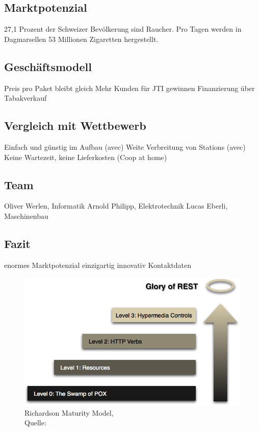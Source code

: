 \subsection{Marktpotenzial}
27,1 Prozent der Schweizer Bevölkerung sind Raucher. 
Pro Tagen werden in Dagmarsellen 53 Millionen Zigaretten hergestellt. 

\subsection{Geschäftsmodell}
Preis pro Paket bleibt gleich
Mehr Kunden für JTI gewinnen
Finanzierung über Tabakverkauf

\subsection{Vergleich mit Wettbewerb}
Einfach und günstig im Aufbau (avec)
Weite Verbreitung von Stations (avec)
Keine Wartezeit, keine Lieferkosten (Coop at home) 
                                                                                                             
\subsection{Team}
Oliver Werlen, Informatik
Arnold Philipp, Elektrotechnik
Lucas Eberli, Maschinenbau

\subsection{Fazit}
enormes Marktpotenzial
einzigartig
innovativ
Kontaktdaten

\begin{figure}[H]
	\centering
	\includegraphics[scale=0.3]{images/richardsonMaturity.png}
	\caption[Richardson Maturity Model]{Richardson Maturity Model,\\ Quelle: \cite{richardsonMaturity}}
	\label{img: richardsonMaturity}
\end{figure}



